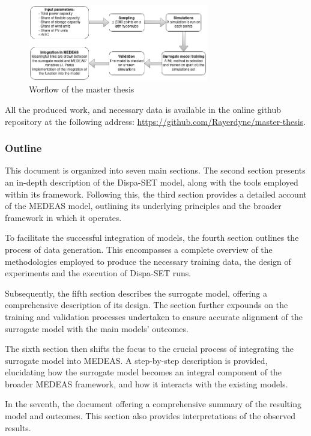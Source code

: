 \begin{figure}[h]
    \centering
    \includegraphics[width=0.7\textwidth]{resources/images/workflow.png}
    \caption{Worflow of the master thesis}
    \label{fig:thesis-workflow}
\end{figure}

All the produced work, and necessary data is available in the online github repository at the following address: \href{https://github.com/Rayerdyne/master-thesis}{https://github.com/Rayerdyne/master-thesis}.

\subsubsection{Outline}

This document is organized into seven main sections. The second section presents an in-depth description of the Dispa-SET model, along with the tools employed within its framework. Following this, the third section provides a detailed account of the MEDEAS model, outlining its underlying principles and the broader framework in which it operates.

To facilitate the successful integration of models, the fourth section outlines the process of data generation. This encompasses a complete overview of the methodologies employed to produce the necessary training data, the design of experiments and the execution of Dispa-SET runs.

Subsequently, the fifth section describes the surrogate model, offering a comprehensive description of its design. The section further expounds on the training and validation processes undertaken to ensure accurate alignment of the surrogate model with the main models' outcomes.

The sixth section then shifts the focus to the crucial process of integrating the surrogate model into MEDEAS. A step-by-step description is provided, elucidating how the surrogate model becomes an integral component of the broader MEDEAS framework, and how it interacts with the existing models.

In the seventh, the document offering a comprehensive summary of the resulting model and outcomes. This section also provides interpretations of the observed results.

